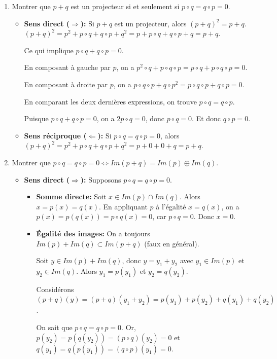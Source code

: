 \documentclass[french]{yLectureNote}
\begin{document}
\begin{enumerate}
    \item Montrer que $p+q$ est un projecteur si et seulement si $p\circ q = q\circ p = 0$.
    \begin{itemize}
        \item \textbf{Sens direct ($\Rightarrow$):} Si $p+q$ est un projecteur, alors $(p+q)^2 = p+q$.
        $(p+q)^2 = p^2+p\circ q+q\circ p+q^2 = p+p\circ q+q\circ p+q = p+q$.

        Ce qui implique $p\circ q+q\circ p=0$.

        En composant à gauche par $p$, on a $p^2\circ q+p\circ q\circ p = p\circ q+p\circ q\circ p = 0$.

        En composant à droite par $p$, on a $p\circ q\circ p+q\circ p^2 = p\circ q\circ p+q\circ p = 0$.

        En comparant les deux dernières expressions, on trouve $p\circ q = q\circ p$.

        Puisque $p\circ q+q\circ p=0$, on a $2p\circ q=0$, donc $p\circ q=0$. Et donc $q\circ p=0$.
        \item \textbf{Sens réciproque ($\Leftarrow$):} Si $p\circ q=q\circ p=0$, alors $(p+q)^2 = p^2+p\circ q+q\circ p+q^2=p+0+0+q=p+q$.
    \end{itemize}

    \item Montrer que $p\circ q=q\circ p=0 \iff Im(p+q)=Im(p)\oplus Im(q)$.
    \begin{itemize}
        \item \textbf{Sens direct ($\Rightarrow$):} Supposons $p\circ q=q\circ p=0$.
        \begin{itemize}
            \item \textbf{Somme directe:} Soit $x \in Im(p)\cap Im(q)$. Alors $x=p(x)=q(x)$. En appliquant $p$ à l'égalité $x=q(x)$, on a $p(x)=p(q(x))=p\circ q(x)=0$, car $p\circ q=0$. Donc $x=0$.
            \item \textbf{Égalité des images:} On a toujours $Im(p)+Im(q) \subset Im(p+q)$ (faux en général).

            Soit $y \in Im(p)+Im(q)$, donc $y=y_1+y_2$ avec $y_1 \in Im(p)$ et $y_2 \in Im(q)$. Alors $y_1=p(y_1)$ et $y_2=q(y_2)$.

            Considérons $(p+q)(y)=(p+q)(y_1+y_2)=p(y_1)+p(y_2)+q(y_1)+q(y_2)$.

            On sait que $p\circ q=q\circ p=0$. Or, $p(y_2)=p(q(y_2))=(p\circ q)(y_2)=0$ et $q(y_1)=q(p(y_1))=(q\circ p)(y_1)=0$.


\end{itemize}
\end{itemize}
\end{enumerate}
\end{document}
